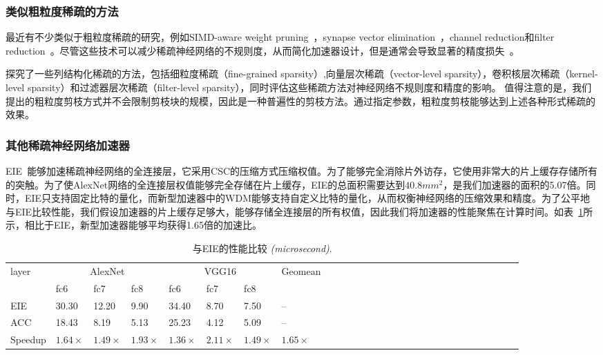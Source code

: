 \subsubsection{类似粗粒度稀疏的方法}
最近有不少类似于粗粒度稀疏的研究，例如SIMD-aware weight pruning~\cite{yu2017scalpel}，synapse vector elimination~\cite{hill2017deftnn}，channel reduction和filter reduction~\cite{wen2016learning,lebedev2016fast}。尽管这些技术可以减少稀疏神经网络的不规则度，从而简化加速器设计，但是通常会导致显著的精度损失~\cite{li2016pruning}。

\citet{mao2017exploring}探究了一些列结构化稀疏的方法，包括细粒度稀疏（fine-grained sparsity）,向量层次稀疏（vector-level sparsity），卷积核层次稀疏（kernel-level sparsity）和过滤器层次稀疏（filter-level sparsity），同时评估这些稀疏方法对神经网络不规则度和精度的影响。 值得注意的是，我们提出的粗粒度剪枝方式并不会限制剪枝块的规模，因此是一种普遍性的剪枝方法。通过指定参数，粗粒度剪枝能够达到上述各种形式稀疏的效果。

\subsubsection{其他稀疏神经网络加速器}
EIE~\cite{han2016eie}能够加速稀疏神经网络的全连接层，它采用CSC的压缩方式压缩权值。为了能够完全消除片外访存，它使用非常大的片上缓存存储所有的突触。为了使AlexNet网络的全连接层权值能够完全存储在片上缓存，EIE的总面积需要达到$40.8mm^2$，是我们加速器的面积的5.07倍。同时，EIE只支持固定比特的量化，而新型加速器中的WDM能够支持自定义比特的量化，从而权衡神经网络的压缩效果和精度。为了公平地与EIE比较性能，我们假设加速器的片上缓存足够大，能够存储全连接层的所有权值，因此我们将加速器的性能聚焦在计算时间。如表~\ref{tab:EIE}所示，相比于EIE，新型加速器能够平均获得1.65倍的加速比。

\begin{table}[h]
\centering
\caption{\footnotesize 与EIE的性能比较 \emph{(microsecond)}.}
\label{tab:EIE}
\begin{tabular}{@{}lll@{~~}lll@{~~}lll@{~~}lll@{~~}lll@{~~}lll@{~~}lll@{~~}lllllll}
\toprule
layer & \multicolumn{3}{c}{AlexNet} & \multicolumn{3}{c}{VGG16} & Geomean\\
& fc6 & fc7 & fc8 & fc6 & fc7 & fc8     \\
\midrule
EIE & 30.30 & 12.20 & 9.90  & 34.40 & 8.70  & 7.50  & --\\
ACC & 18.43 & 8.19  & 5.13  & 25.23 & 4.12  & 5.09  & --\\
Speedup & $1.64\times$ & $1.49\times$ & $1.93\times$ & $1.36\times$ & $2.11\times$ & $1.49\times$ & $1.65\times$ \\
\bottomrule
\end{tabular}
\end{table}

